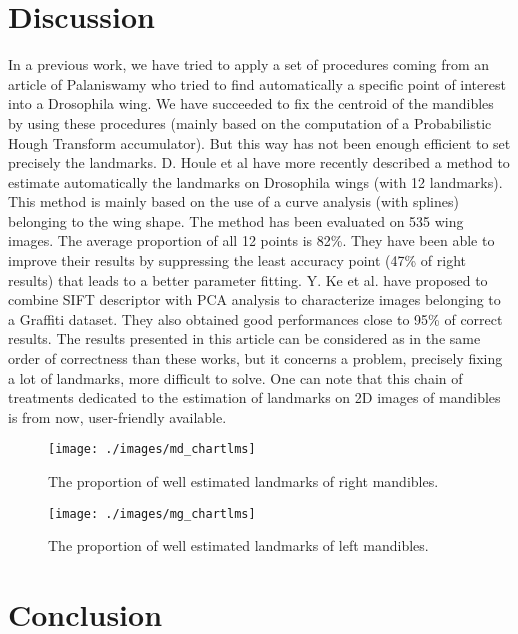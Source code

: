 \documentclass[twoside,twocolumn,10pt]{article}
\begin{document}
\section{Discussion}
In  a previous work, we have tried to apply a set of procedures
coming from an article of Palaniswamy \cite{palaniswamy2010automatic} who tried to find
automatically a specific point of interest into a Drosophila wing. We
have succeeded to fix the centroid of the mandibles by using these
procedures (mainly based on the computation of a Probabilistic Hough
Transform accumulator). But this way has not been enough efficient to set
precisely the landmarks. D. Houle et al \cite{houle2003automated}
have more recently described a method to estimate automatically the
landmarks on Drosophila wings (with 12 landmarks). This method is
mainly based on the use of a curve analysis (with splines) belonging
to the wing shape. The method has been evaluated on 535 wing images.
The average proportion of all 12 points is 82\%. They have been able
to improve their results by suppressing the least accuracy point (47\%
of right results) that leads to a better parameter fitting. Y. Ke et
al. \cite{ke2004pca} have proposed to combine SIFT descriptor
with PCA analysis to characterize images belonging to a Graffiti
dataset. They also obtained good performances close to 95\% of correct
results. The results presented in this article can be considered as in
the same order of correctness than these works, but it concerns a problem, precisely fixing a
lot of landmarks, more difficult to solve. One can note that this chain of
treatments dedicated to the  estimation of landmarks on 2D images of
mandibles is from now, user-friendly available.



\begin{figure}[htbp]
    \centering
    \texttt{[image: ./images/md\_chartlms]}
    \caption{The proportion of well estimated landmarks of right mandibles.}
    \label{figmdresultlm}
\end{figure}
\begin{figure}[htbp]
    \centering
    \texttt{[image: ./images/mg\_chartlms]}
    \caption{The proportion of well estimated landmarks of left mandibles.}
    \label{figmgresultlm}
\end{figure}

\section{Conclusion}
\end{document}
